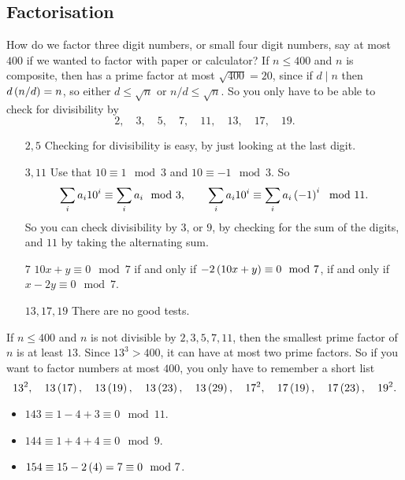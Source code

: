 \subsection{Factorisation}

How do we factor three digit numbers, or small four digit numbers, say at most $ 400 $ if we wanted to factor with paper or calculator? If $ n \le 400 $ and $ n $ is composite, then has a prime factor at most $ \sqrt{400} = 20 $, since if $ d \mid n $ then $ d\left( n / d \right) = n $, so either $ d \le \sqrt{n} $ or $ n / d \le \sqrt{n} $. So you only have to be able to check for divisibility by
$$ 2, \quad 3, \quad 5, \quad 7, \quad 11, \quad 13, \quad 17, \quad 19. $$
\begin{itemize}[leftmargin=0.75in]
\item[$ 2, 5 $] Checking for divisibility is easy, by just looking at the last digit.
\item[$ 3, 11 $] Use that $ 10 \equiv 1 \mod 3 $ and $ 10 \equiv -1 \mod 3 $. So
$$ \sum_i a_i10^i \equiv \sum_i a_i \mod 3, \qquad \sum_i a_i10^i \equiv \sum_i a_i\left( -1 \right)^i \mod 11. $$
So you can check divisibility by $ 3 $, or $ 9 $, by checking for the sum of the digits, and $ 11 $ by taking the alternating sum.
\item[$ 7 $] $ 10x + y \equiv 0 \mod 7 $ if and only if $ -2\left( 10x + y \right) \equiv 0 \mod 7 $, if and only if $ x - 2y \equiv 0 \mod 7 $.
\item[$ 13, 17, 19 $] There are no good tests.
\end{itemize}
If $ n \le 400 $ and $ n $ is not divisible by $ 2, 3, 5, 7, 11 $, then the smallest prime factor of $ n $ is at least $ 13 $. Since $ 13^3 > 400 $, it can have at most two prime factors. So if you want to factor numbers at most $ 400 $, you only have to remember a short list
$$ 13^2, \quad 13\left( 17 \right), \quad 13\left( 19 \right), \quad 13\left( 23 \right), \quad 13\left( 29 \right), \quad 17^2, \quad 17\left( 19 \right), \quad 17\left( 23 \right), \quad 19^2. $$

\begin{example2}
\hfill
\begin{itemize}
\item $ 143 \equiv 1 - 4 + 3 \equiv 0 \mod 11 $.
\item $ 144 \equiv 1 + 4 + 4 \equiv 0 \mod 9 $.
\item $ 154 \equiv 15 - 2\left( 4 \right) = 7 \equiv 0 \mod 7 $.
\end{itemize}
\end{example2}


